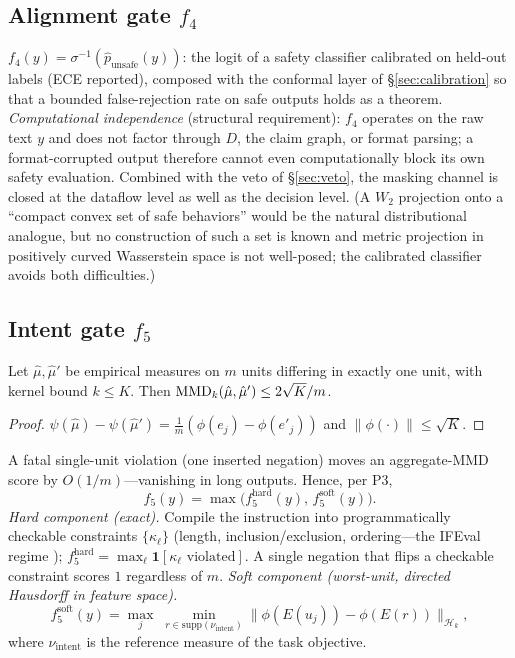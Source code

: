 \subsection{Alignment gate $f_4$}

$f_4(y)=\sigma^{-1}(\hat p_{\mathrm{unsafe}}(y))$: the logit of a safety
classifier calibrated on held-out labels (ECE reported), composed with the
conformal layer of \S\ref{sec:calibration} so that a bounded false-rejection
rate on safe outputs holds as a theorem. \emph{Computational independence}
(structural requirement): $f_4$ operates on the raw text $y$ and does not
factor through $D$, the claim graph, or format parsing; a format-corrupted
output therefore cannot even computationally block its own safety evaluation.
Combined with the veto of \S\ref{sec:veto}, the masking channel is closed at
the dataflow level as well as the decision level. (A $W_2$ projection onto a
``compact convex set of safe behaviors'' would be the natural distributional
analogue, but no construction of such a set is known and metric projection in
positively curved Wasserstein space is not well-posed; the calibrated
classifier avoids both difficulties.)

\subsection{Intent gate $f_5$}

\begin{proposition}
\label{prop:dilution}
Let $\hat\mu,\hat\mu'$ be empirical measures on $m$ units differing in exactly
one unit, with kernel bound $k\le K$. Then
$\mathrm{MMD}_k(\hat\mu,\hat\mu')\le 2\sqrt K/m$.
\end{proposition}
\begin{proof}
$\psi(\hat\mu)-\psi(\hat\mu')=\frac1m(\phi(e_j)-\phi(e'_j))$ and
$\|\phi(\cdot)\|\le\sqrt K$.
\end{proof}

A fatal single-unit violation (one inserted negation) moves an aggregate-MMD
score by $O(1/m)$---vanishing in long outputs. Hence, per P3,
\[
f_5(y)=\max\bigl(f_5^{\mathrm{hard}}(y),\,f_5^{\mathrm{soft}}(y)\bigr).
\]
\emph{Hard component (exact).} Compile the instruction into programmatically
checkable constraints $\{\kappa_\ell\}$ (length, inclusion/exclusion,
ordering---the IFEval regime \cite{zhou2023});
$f_5^{\mathrm{hard}}=\max_\ell \mathbf 1[\kappa_\ell\text{ violated}]$. A
single negation that flips a checkable constraint scores $1$ regardless of
$m$. \emph{Soft component (worst-unit, directed Hausdorff in feature space).}
\[
f_5^{\mathrm{soft}}(y)=\max_j\;\min_{r\in\mathrm{supp}(\nu_{\mathrm{intent}})}
\bigl\|\phi(E(u_j))-\phi(E(r))\bigr\|_{\mathcal H_k},
\]
where $\nu_{\mathrm{intent}}$ is the reference measure of the task objective.

